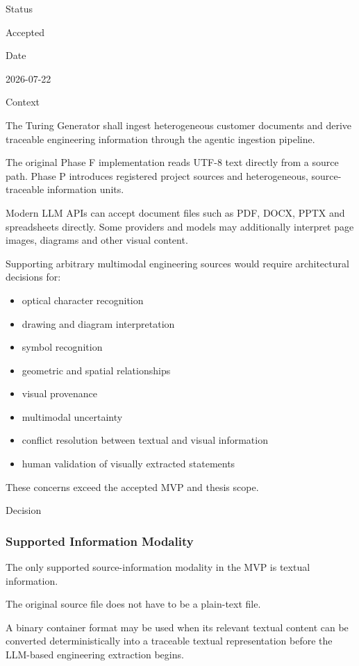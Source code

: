 Status

Accepted

Date

2026-07-22

Context

The Turing Generator shall ingest heterogeneous customer documents and derive traceable engineering information through the agentic ingestion pipeline.

The original Phase F implementation reads UTF-8 text directly from a source path. Phase P introduces registered project sources and heterogeneous, source-traceable information units.

Modern LLM APIs can accept document files such as PDF, DOCX, PPTX and spreadsheets directly. Some providers and models may additionally interpret page images, diagrams and other visual content.

Supporting arbitrary multimodal engineering sources would require architectural decisions for:

\begin{itemize}
\tightlist
\item
  optical character recognition
\item
  drawing and diagram interpretation
\item
  symbol recognition
\item
  geometric and spatial relationships
\item
  visual provenance
\item
  multimodal uncertainty
\item
  conflict resolution between textual and visual information
\item
  human validation of visually extracted statements
\end{itemize}

These concerns exceed the accepted MVP and thesis scope.

Decision

\hypertarget{supported-information-modality}{%
\subsubsection{Supported Information Modality}\label{supported-information-modality}}

The only supported source-information modality in the MVP is textual information.

The original source file does not have to be a plain-text file.

A binary container format may be used when its relevant textual content can be converted deterministically into a traceable textual representation before the LLM-based engineering extraction begins.

